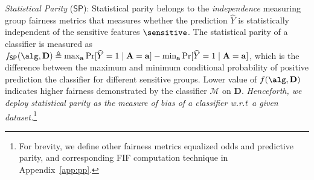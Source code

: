 	\textit{Statistical Parity} ($ \mathsf{SP} $): Statistical parity belongs to the \textit{independence} measuring group fairness metrics that measures whether the prediction $ \widehat{Y} $ is statistically independent of the sensitive features $ \sensitive $.  The statistical parity of  a classifier is measured as $ f_{\mathsf{SP}}(\alg, \mathbf{D}) \triangleq \max_{\mathbf{a}}\Pr[\widehat{Y} =1 \mid \mathbf{A} = \mathbf{a}] - \min_{\mathbf{a}}\Pr[\widehat{Y} =1 \mid \mathbf{A} = \mathbf{a}] $, which is the difference between the maximum and minimum conditional probability of positive prediction the classifier for different sensitive groups. Lower value of $ f(\alg, \mathbf{D}) $ indicates higher fairness demonstrated by the classifier $\mathcal{M}$ on $ \mathbf{D} $. \textit{Henceforth, we deploy statistical parity as the measure of bias of a classifier w.r.t\ a given dataset.}\footnote{For brevity, we define other  fairness metrics equalized odds and predictive parity, and corresponding FIF computation technique in Appendix~\ref{app:pp}.}
	

	
	


